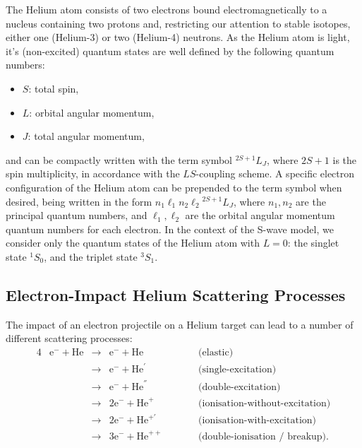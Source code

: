 \documentclass[]{article}
\begin{document}
The Helium atom consists of two electrons bound electromagnetically to a nucleus
containing two protons and, restricting our attention to stable isotopes, either
one (Helium-3) or two (Helium-4) neutrons.
As the Helium atom is light, it's (non-excited) quantum states are well defined
by the following quantum numbers:
\begin{itemize}
\item $S$: total spin,
\item $L$: orbital angular momentum,
\item $J$: total angular momentum,
\end{itemize}
and can be compactly written with the term symbol ${}^{2S + 1}L_{J}$, where
$2S + 1$ is the spin multiplicity, in accordance with the $LS$-coupling scheme.
A specific electron configuration of the Helium atom can be prepended to the
term symbol when desired, being written in the form
$n_{1}\ell_{1} n_{2}\ell_{2} {}^{2S + 1}L_{J}$, where $n_{1}, n_{2}$ are the
principal quantum numbers, and $\ell_{1}, \ell_{2}$ are the orbital angular
momentum quantum numbers for each electron.
In the context of the S-wave model, we consider only the quantum states of the
Helium atom with $L = 0$: the singlet state ${}^{1}S_{0}$, and the triplet state
${}^{3}S_{1}$.

\subsection{Electron-Impact Helium Scattering Processes}
\label{sec:in-proc}


The impact of an electron projectile on a Helium target can lead to a number of
different scattering processes:
\begin{alignat*}{4}
  &
  \mathrm{e}^{-}
  +
  \mathrm{He}
  &
  {}\to{}
  &
  \mathrm{e}^{-}
  +
  \mathrm{He}
  &
  \quad\quad
  &
  \text{(elastic)}
  \\
  &
  &
  {}\to{}
  &
  \mathrm{e}^{-}
  +
  \mathrm{He}^{'}
  &
  &
  \text{(single-excitation)}
  \\
  &
  &
  {}\to{}
  &
  \mathrm{e}^{-}
  +
  \mathrm{He}^{''}
  &
  &
  \text{(double-excitation)}
  \\
  &
  &
  {}\to{}
  &
  2
  \mathrm{e}^{-}
  +
  \mathrm{He}^{+}
  &
  &
  \text{(ionisation-without-excitation)}
  \\
  &
  &
  {}\to{}
  &
  2
  \mathrm{e}^{-}
  +
  \mathrm{He}^{+'}
  &
  &
  \text{(ionisation-with-excitation)}
  \\
  &
  &
  {}\to{}
  &
  3
  \mathrm{e}^{-}
  +
  \mathrm{He}^{++}
  &
  &
  \text{(double-ionisation / breakup)}
  .
\end{alignat*}
\end{document}
